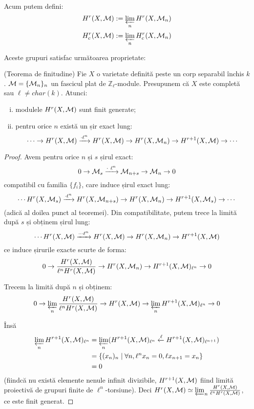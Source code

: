 \documentclass[13pt,openany]{book}
\begin{document}
Acum putem defini:
$$H^r(X,\mathcal{M}):=\varprojlim_n H^r(X,\mathcal{M}_n)$$
$$H^r_c(X,\mathcal{M}):=\varprojlim_n H^r_c(X,\mathcal{M}_n)$$

Aceste grupuri satisfac următoarea proprietate:

\begin{teo}
(Teorema de finitudine) Fie $X$ o varietate definită peste un corp separabil închis $k$. $\mathcal{M}=\{\mathcal{M}_n\}_n$ un fascicul plat de $\mathbb{Z}_\ell$-module. Presupunem că $X$ este completă sau $\ell \neq char(k)$. Atunci:
\begin{enumerate}[(i)]
\item modulele $H^r(X,\mathcal{M})$ sunt finit generate;
\item pentru orice $n$ există un șir exact lung:
$$\cdots \rightarrow H^r(X,\mathcal{M}) \xrightarrow{\cdot \ell^n} H^r(X,\mathcal{M}) \rightarrow H^r(X,\mathcal{M}_n) \rightarrow H^{r+1}(X,\mathcal{M}) \rightarrow \cdots$$
\end{enumerate}
\end{teo}

\begin{proof}
Avem pentru orice $n$ și $s$ șirul exact:
$$0 \rightarrow \mathcal{M}_s \xrightarrow{\cdot\ \ell^n} \mathcal{M}_{n+s} \rightarrow \mathcal{M}_n \rightarrow 0$$
compatibil cu familia $\{f_i\}$, care induce șirul exact lung:
$$\cdots H^r(X,\mathcal{M}_s) \xrightarrow{\cdot \ell^n} H^r(X,\mathcal{M}_{n+s}) \rightarrow H^r(X,\mathcal{M}_n) \rightarrow H^{r+1}(X,\mathcal{M}_s) \rightarrow \cdots$$
(adică al doilea punct al teoremei).
Din compatibilitate, putem trece la limită după $s$ și obținem șirul lung:
$$\cdots H^r(X,\mathcal{M}) \xrightarrow{\cdots \ell^n} H^r(X,\mathcal{M}) \rightarrow H^r(X,\mathcal{M}_n) \rightarrow H^{r+1}(X,\mathcal{M})$$
ce induce șirurile exacte scurte de forma:
$$0 \rightarrow \frac{H^r(X,\mathcal{M})}{\ell^n H^r(X,\mathcal{M})} \rightarrow H^r(X,\mathcal{M}_n) \rightarrow H^{r+1}(X,\mathcal{M})_{\ell^n} \rightarrow 0$$

Trecem la limită după $n$ și obținem:
$$0 \rightarrow \varprojlim_n \frac{H^r(X,\mathcal{M})}{\ell^n H^r(X,\mathcal{M})} \rightarrow H^r(X,\mathcal{M}) \rightarrow \varprojlim_n H^{r+1}(X,\mathcal{M})_{\ell^n} \rightarrow 0$$

Însă
\begin{align*}
\varprojlim_n H^{r+1}(X,\mathcal{M})_{\ell^n} &= \varprojlim_n (H^{r+1}(X,\mathcal{M})_{\ell^n} \xleftarrow{\ell} H^{r+1}(X,\mathcal{M})_{\ell^{n+1}})\\
&=\{(x_n)_n \mid \forall n, \ell^n x_n=0, \ell x_{n+1}=x_n\}\\
&=0
\end{align*}
(fiindcă nu există elemente nenule infinit divizibile, $H^{r+1}(X,\mathcal{M})$ fiind limită proiectivă de grupuri finite de $\ell^n$-torsiune). Deci $H^r(X,\mathcal{M})\simeq \varprojlim_n \frac{H^r(X,\mathcal{M})}{\ell^n H^r(X,\mathcal{M})}$, ce este finit generat.
\end{proof}
\end{document}
